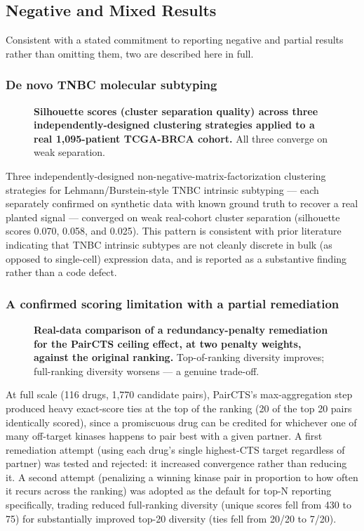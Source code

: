 \documentclass[10pt,letterpaper]{article}
\begin{document}
\subsection*{Negative and Mixed Results}
Consistent with a stated commitment to reporting negative and partial results rather than omitting them, two are described here in full.

\subsubsection*{De novo TNBC molecular subtyping}
\begin{figure}[!h]
\caption{\textbf{Silhouette scores (cluster separation quality) across three independently-designed clustering strategies applied to a real 1,095-patient TCGA-BRCA cohort.} All three converge on weak separation.}
\label{fig3}
\end{figure}

Three independently-designed non-negative-matrix-factorization clustering strategies for Lehmann/Burstein-style TNBC intrinsic subtyping --- each separately confirmed on synthetic data with known ground truth to recover a real planted signal --- converged on weak real-cohort cluster separation (silhouette scores 0.070, 0.058, and 0.025). This pattern is consistent with prior literature indicating that TNBC intrinsic subtypes are not cleanly discrete in bulk (as opposed to single-cell) expression data, and is reported as a substantive finding rather than a code defect.

\subsubsection*{A confirmed scoring limitation with a partial remediation}
\begin{figure}[!h]
\caption{\textbf{Real-data comparison of a redundancy-penalty remediation for the PairCTS ceiling effect, at two penalty weights, against the original ranking.} Top-of-ranking diversity improves; full-ranking diversity worsens --- a genuine trade-off.}
\label{fig4}
\end{figure}

At full scale (116 drugs, 1,770 candidate pairs), PairCTS's max-aggregation step produced heavy exact-score ties at the top of the ranking (20 of the top 20 pairs identically scored), since a promiscuous drug can be credited for whichever one of many off-target kinases happens to pair best with a given partner. A first remediation attempt (using each drug's single highest-CTS target regardless of partner) was tested and rejected: it increased convergence rather than reducing it. A second attempt (penalizing a winning kinase pair in proportion to how often it recurs across the ranking) was adopted as the default for top-N reporting specifically, trading reduced full-ranking diversity (unique scores fell from 430 to 75) for substantially improved top-20 diversity (ties fell from 20/20 to 7/20).
\end{document}
